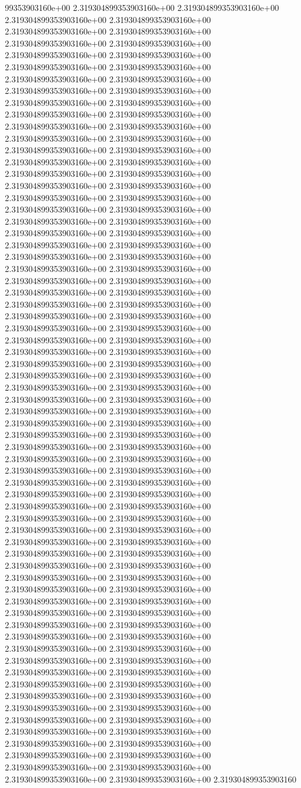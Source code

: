 99353903160e+00	2.319304899353903160e+00	2.319304899353903160e+00	2.319304899353903160e+00	2.319304899353903160e+00	2.319304899353903160e+00	2.319304899353903160e+00	2.319304899353903160e+00	2.319304899353903160e+00	2.319304899353903160e+00	2.319304899353903160e+00	2.319304899353903160e+00	2.319304899353903160e+00	2.319304899353903160e+00	2.319304899353903160e+00	2.319304899353903160e+00	2.319304899353903160e+00	2.319304899353903160e+00	2.319304899353903160e+00	2.319304899353903160e+00	2.319304899353903160e+00	2.319304899353903160e+00	2.319304899353903160e+00	2.319304899353903160e+00	2.319304899353903160e+00	2.319304899353903160e+00	2.319304899353903160e+00	2.319304899353903160e+00	2.319304899353903160e+00	2.319304899353903160e+00	2.319304899353903160e+00	2.319304899353903160e+00	2.319304899353903160e+00	2.319304899353903160e+00	2.319304899353903160e+00	2.319304899353903160e+00	2.319304899353903160e+00	2.319304899353903160e+00	2.319304899353903160e+00	2.319304899353903160e+00	2.319304899353903160e+00	2.319304899353903160e+00	2.319304899353903160e+00	2.319304899353903160e+00	2.319304899353903160e+00	2.319304899353903160e+00	2.319304899353903160e+00	2.319304899353903160e+00	2.319304899353903160e+00	2.319304899353903160e+00	2.319304899353903160e+00	2.319304899353903160e+00	2.319304899353903160e+00	2.319304899353903160e+00	2.319304899353903160e+00	2.319304899353903160e+00	2.319304899353903160e+00	2.319304899353903160e+00	2.319304899353903160e+00	2.319304899353903160e+00	2.319304899353903160e+00	2.319304899353903160e+00	2.319304899353903160e+00	2.319304899353903160e+00	2.319304899353903160e+00	2.319304899353903160e+00	2.319304899353903160e+00	2.319304899353903160e+00	2.319304899353903160e+00	2.319304899353903160e+00	2.319304899353903160e+00	2.319304899353903160e+00	2.319304899353903160e+00	2.319304899353903160e+00	2.319304899353903160e+00	2.319304899353903160e+00	2.319304899353903160e+00	2.319304899353903160e+00	2.319304899353903160e+00	2.319304899353903160e+00	2.319304899353903160e+00	2.319304899353903160e+00	2.319304899353903160e+00	2.319304899353903160e+00	2.319304899353903160e+00	2.319304899353903160e+00	2.319304899353903160e+00	2.319304899353903160e+00	2.319304899353903160e+00	2.319304899353903160e+00	2.319304899353903160e+00	2.319304899353903160e+00	2.319304899353903160e+00	2.319304899353903160e+00	2.319304899353903160e+00	2.319304899353903160e+00	2.319304899353903160e+00	2.319304899353903160e+00	2.319304899353903160e+00	2.319304899353903160e+00	2.319304899353903160e+00	2.319304899353903160e+00	2.319304899353903160e+00	2.319304899353903160e+00	2.319304899353903160e+00	2.319304899353903160e+00	2.319304899353903160e+00	2.319304899353903160e+00	2.319304899353903160e+00	2.319304899353903160e+00	2.319304899353903160e+00	2.319304899353903160e+00	2.319304899353903160e+00	2.319304899353903160e+00	2.319304899353903160e+00	2.319304899353903160e+00	2.319304899353903160e+00	2.319304899353903160e+00	2.319304899353903160e+00	2.319304899353903160e+00	2.319304899353903160e+00	2.319304899353903160e+00	2.319304899353903160e+00	2.319304899353903160e+00	2.319304899353903160e+00	2.319304899353903160e+00	2.319304899353903160e+00	2.319304899353903160e+00	2.319304899353903160e+00	2.319304899353903160e+00	2.319304899353903160e+00	2.319304899353903160e+00	2.319304899353903160e+00	2.319304899353903160